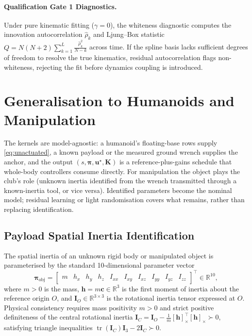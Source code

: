 \documentclass[11pt,a4paper]{article}
\newcommand{\R}{\mathbb{R}}
\newcommand{\bu}{\mathbf{u}}
\newcommand{\bh}{\mathbf{h}}
\newcommand{\bK}{\mathbf{K}}
\newcommand{\bpi}{\boldsymbol{\pi}}
\begin{document}
\paragraph{Qualification Gate 1 Diagnostics.}
Under pure kinematic fitting ($\gamma=0$), the whiteness diagnostic computes the innovation autocorrelation $\hat{\rho}_k$ and Ljung--Box statistic $Q = N(N+2)\sum_{k=1}^L \frac{\hat{\rho}_k^2}{N-k}$ across time. If the spline basis lacks sufficient degrees of freedom to resolve the true kinematics, residual autocorrelation flags non-whiteness, rejecting the fit before dynamics coupling is introduced.

\section{Generalisation to Humanoids and Manipulation}
The kernels are model-agnostic: a humanoid's floating-base rows supply
\eqref{eq:unactuated}, a known payload or the measured ground wrench supplies
the anchor, and the output $(s,\bpi,\bu^\star,\bK)$ is a reference-plus-gains
schedule that whole-body controllers consume directly.  For manipulation the
object plays the club's role (unknown inertia identified from the wrench
transmitted through a known-inertia tool, or vice versa).  Identified
parameters become the nominal model; residual learning or light randomisation
covers what remains, rather than replacing identification.

\subsection{Payload Spatial Inertia Identification}
\label{sec:payload_identification}
The spatial inertia of an unknown rigid body or manipulated object is
parameterised by the standard 10-dimensional parameter vector
\begin{equation}
  \bpi_{\mathrm{obj}} = \begin{bmatrix} m & h_x & h_y & h_z & I_{xx} & I_{xy} & I_{xz} & I_{yy} & I_{yz} & I_{zz} \end{bmatrix}^{\!\top} \in \R^{10},
  \label{eq:spatial_inertia_param}
\end{equation}
where $m > 0$ is the mass, $\bh = m\mathbf{c} \in \R^3$ is the first moment of
inertia about the reference origin $O$, and $\mathbf{I}_O \in \R^{3\times3}$ is the rotational
inertia tensor expressed at $O$.  Physical consistency requires mass positivity
$m > 0$ and strict positive definiteness of the central rotational inertia
$\mathbf{I}_C = \mathbf{I}_O - \frac{1}{m}[\bh]_\times^{\!\top}[\bh]_\times \succ 0$,
satisfying triangle inequalities $\operatorname{tr}(\mathbf{I}_C)\mathbf{I}_3 - 2\mathbf{I}_C \succ 0$.
\end{document}
